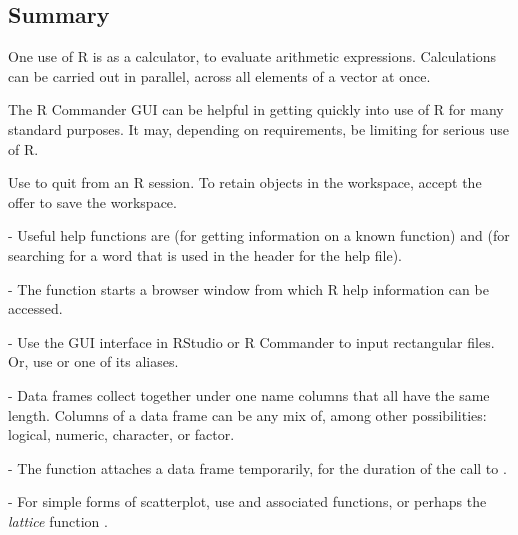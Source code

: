 \subsection{Summary}
\begin{itemizz}
\item[] One use of R is as a calculator, to evaluate arithmetic
expressions. Calculations can be carried out in parallel, across all
elements of a vector at once.

\item[] The R Commander GUI can be helpful in getting quickly into use
  of R for many standard purposes.  It may, depending on requirements,
  be limiting for serious use of R.

\item[] Use  to quit from an R session. To retain objects in
  the workspace, accept the offer to save the workspace.
\item[-] Useful help functions
are  (for getting information on a known function)
and  (for searching for a word that is used
in the header for the help file).

\item[-] The function  starts a browser window from
  which R help information can be accessed.

\item[-]
Use the GUI interface in RStudio or R Commander to input
rectangular files.  Or, use  or one
of its aliases.

\item[-] Data frames collect together under one name columns that all
  have the same length.  Columns of a data frame can be any mix of,
  among other possibilities: logical, numeric, character, or factor.

\item[-] The function  attaches a data frame temporarily,
  for the duration of the call to .

\item[-] For simple forms of scatterplot, use  and associated
functions, or perhaps the {\em lattice} function .

\end{itemizz}

